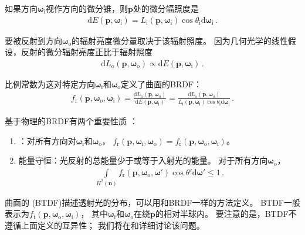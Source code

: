 如果方向${\bm\omega}_{\mathrm{i}}$视作方向的微分锥，则$\bm p$处的微分辐照度是
\begin{align}\label{eq:5.7}
    \mathrm{d}E({\bm p},{\bm\omega}_{\mathrm{i}})=L_{\mathrm{i}}({\bm p},{\bm\omega}_{\mathrm{i}})\cos\theta_{\mathrm{i}}\mathrm{d}{\bm\omega}_{\mathrm{i}}\, .
\end{align}

要被反射到方向${\bm\omega}_{\mathrm{o}}$的辐射亮度微分量取决于该辐射照度。
因为几何光学的线性假设，反射的微分辐射亮度正比于辐射照度
\begin{align*}
    \mathrm{d}L_{\mathrm{o}}({\bm p},{\bm\omega}_{\mathrm{o}})\propto\mathrm{d}E({\bm p},{\bm\omega}_{\mathrm{i}})\, .
\end{align*}

比例常数为这对特定方向${\bm\omega}_{\mathrm{i}}$和${\bm\omega}_{\mathrm{o}}$定义了曲面的BRDF：
\begin{align}\label{eq:5.8}
    f_{\mathrm{r}}({\bm p},{\bm \omega}_\mathrm{o},{\bm \omega}_\mathrm{i})=\frac{\mathrm{d}L_{\mathrm{o}}({\bm p},{\bm\omega}_{\mathrm{o}})}{\mathrm{d}E({\bm p},{\bm\omega}_{\mathrm{i}})}=\frac{\mathrm{d}L_{\mathrm{o}}({\bm p},{\bm\omega}_{\mathrm{o}})}{L_{\mathrm{i}}({\bm p},{\bm\omega}_{\mathrm{i}})\cos\theta_{\mathrm{i}}\mathrm{d}{\bm\omega}_{\mathrm{i}}}\, .
\end{align}

基于物理的BRDF有两个重要性质
：
\begin{enumerate}
    \item {}：对所有方向对${\bm\omega}_{\mathrm{i}}$和${\bm\omega}_{\mathrm{o}}$，
          $f_{\mathrm{r}}({\bm p},{\bm \omega}_\mathrm{i},{\bm \omega}_\mathrm{o})=f_{\mathrm{r}}({\bm p},{\bm \omega}_\mathrm{o},{\bm \omega}_\mathrm{i})$。
    \item {\sffamily 能量守恒}：光反射的总能量少于或等于入射光的能量。
          对于所有方向${\bm\omega}_{\mathrm{o}}$，
          \begin{align*}
              \int\limits_{H^2({\bm n})}f_{\mathrm{r}}({\bm p},{\bm \omega}_\mathrm{o},{\bm \omega}')\cos\theta'\mathrm{d}{\bm\omega}'\le1\, .
          \end{align*}
\end{enumerate}

曲面的
(BTDF)描述透射光的分布，可以用和BRDF一样的方法定义。
BTDF一般表示为$f_{\mathrm{t}}({\bm p},{\bm \omega}_\mathrm{o},{\bm \omega}_\mathrm{i})$，
其中${\bm\omega}_{\mathrm{i}}$和${\bm\omega}_{\mathrm{o}}$在绕$\bm p$的相对半球内。
要注意的是，BTDF不遵循上面定义的互异性；
我们将在和详细讨论该问题。

